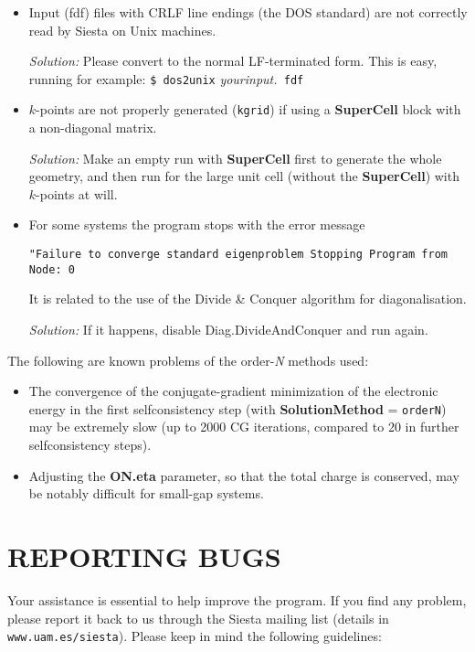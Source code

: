 \documentclass[11pt]{article}
\begin{document}
\begin{itemize}

\item
Input (fdf) files with CRLF line endings (the DOS standard) are not
correctly read by {\sc Siesta} on Unix machines. 

{\it Solution:} Please convert to the normal LF-terminated form. This
is easy, running for example: {\tt \$ dos2unix} {\it yourinput.}{\tt
fdf}

\item
$k$-points are not properly generated ({\tt kgrid}) if using a
{\bf SuperCell} block with a non-diagonal matrix. 

{\it Solution:} Make an empty run with {\bf SuperCell} first to generate 
the whole geometry, and then run for the large unit cell (without the 
{\bf SuperCell}) with $k$-points at will.

\item 
For some systems the program stops with the error message

{\tt "Failure to converge standard eigenproblem
Stopping Program from Node:    0}

It is related to the use of the Divide \& Conquer algorithm for
diagonalisation.

{\it Solution:} If it happens, disable Diag.DivideAndConquer and run again. 

\end{itemize}

The following are known problems of the order-{\it N} methods used:

\begin{itemize}

\item
The convergence of the conjugate-gradient minimization of the
electronic energy in the first selfconsistency step (with
{\bf SolutionMethod} = {\tt orderN}) may be extremely slow 
(up to 2000 CG iterations, compared to 20 in further 
selfconsistency steps).

\item
Adjusting the {\bf ON.eta} parameter, so that the total charge
is conserved, may be notably difficult for small-gap systems.

\end{itemize}


\section{REPORTING BUGS}
Your assistance is essential to help improve the program. If you find
any problem, please report it back to us through the {\sc Siesta} mailing
list (details in {\tt www.uam.es/siesta}). Please keep in mind
the following guidelines:
\end{document}
